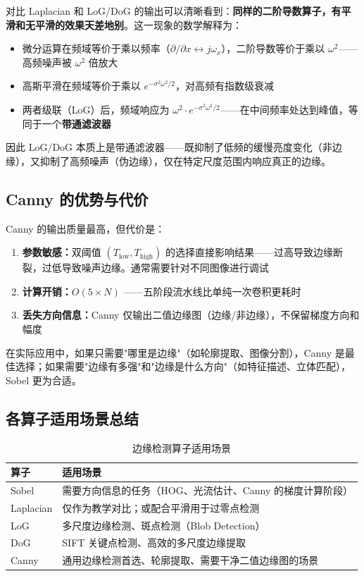 \documentclass[12pt,a4paper]{ctexart}
\begin{document}
对比 Laplacian 和 LoG/DoG 的输出可以清晰看到：\textbf{同样的二阶导数算子，有平滑和无平滑的效果天差地别}。这一现象的数学解释为：

\begin{itemize}
    \item 微分运算在频域等价于乘以频率（$\partial/\partial x \leftrightarrow j\omega_x$），二阶导数等价于乘以 $\omega^2$——高频噪声被 $\omega^2$ 倍放大
    \item 高斯平滑在频域等价于乘以 $e^{-\sigma^2\omega^2/2}$，对高频有指数级衰减
    \item 两者级联（LoG）后，频域响应为 $\omega^2 \cdot e^{-\sigma^2\omega^2/2}$——在中间频率处达到峰值，等同于一个\textbf{带通滤波器}
\end{itemize}

因此 LoG/DoG 本质上是带通滤波器——既抑制了低频的缓慢亮度变化（非边缘），又抑制了高频噪声（伪边缘），仅在特定尺度范围内响应真正的边缘。

\subsection{Canny 的优势与代价}

Canny 的输出质量最高，但代价是：
\begin{enumerate}[leftmargin=*]
    \item \textbf{参数敏感：}双阈值 $(T_{\text{low}}, T_{\text{high}})$ 的选择直接影响结果——过高导致边缘断裂，过低导致噪声边缘。通常需要针对不同图像进行调试
    \item \textbf{计算开销：}$O(5\times N)$ ——五阶段流水线比单纯一次卷积更耗时
    \item \textbf{丢失方向信息：}Canny 仅输出二值边缘图（边缘/非边缘），不保留梯度方向和幅度
\end{enumerate}

在实际应用中，如果只需要"哪里是边缘"（如轮廓提取、图像分割），Canny 是最佳选择；如果需要"边缘有多强"和"边缘是什么方向"（如特征描述、立体匹配），Sobel 更为合适。

\subsection{各算子适用场景总结}

\begin{table}[H]
    \centering
    \caption{边缘检测算子适用场景}
    \begin{tabular}{lp{9cm}}
        \toprule
        \textbf{算子} & \textbf{适用场景} \\
        \midrule
        Sobel & 需要方向信息的任务（HOG、光流估计、Canny 的梯度计算阶段） \\
        Laplacian & 仅作为教学对比；或配合平滑用于过零点检测 \\
        LoG & 多尺度边缘检测、斑点检测（Blob Detection） \\
        DoG & SIFT 关键点检测、高效的多尺度边缘提取 \\
        Canny & 通用边缘检测首选、轮廓提取、需要干净二值边缘图的场景 \\
        \bottomrule
    \end{tabular}
\end{table}
\end{document}
